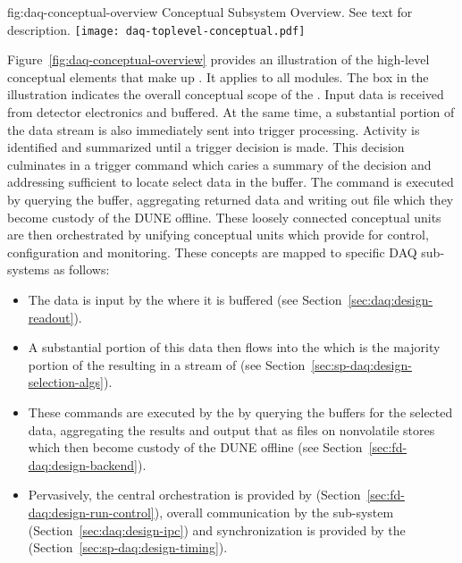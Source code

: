 \begin{dunefigure}{fig:daq-conceptual-overview}{ Conceptual
    Subsystem Overview.  See text for description.}
  \texttt{[image: daq-toplevel-conceptual.pdf]}
\end{dunefigure}


Figure~\ref{fig:daq-conceptual-overview} provides an illustration of the high-level conceptual elements that make up   . 
It applies to all  modules. 
The box in the illustration indicates the overall conceptual scope of the .
Input data is received from detector electronics and buffered. 
At the same time, a substantial portion of the data stream is also immediately sent into trigger processing. 
Activity is identified and summarized until a trigger decision is made. 
This decision culminates in a trigger command which caries a summary of the decision and addressing sufficient to locate select data in the buffer.
The command is executed by querying the buffer, aggregating returned data and writing out file which they become custody of the DUNE offline.
These loosely connected conceptual units are then orchestrated by unifying conceptual units which provide for control, configuration and monitoring.
These concepts are mapped to specific DAQ sub-systems as follows:

\begin{itemize}
\item The data is input by the  where it is buffered (see Section~\ref{sec:daq:design-readout}).

\item A substantial portion of this data then flows into the  which is the majority portion of the  resulting in a stream of  (see Section~\ref{sec:sp-daq:design-selection-algs}).

\item These commands are executed by the  by querying the buffers for the selected data, aggregating the results and output that as files on nonvolatile stores which then become custody of the DUNE offline (see Section~\ref{sec:fd-daq:design-backend}).

\item Pervasively, the central orchestration is provided by  (Section~\ref{sec:fd-daq:design-run-control}), overall communication by the  sub-system (Section~\ref{sec:daq:design-ipc}) and synchronization is provided by the  (Section~\ref{sec:sp-daq:design-timing}).
\end{itemize}



